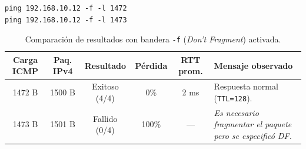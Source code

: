 \documentclass[11pt, a4paper]{article}
\begin{document}
\begin{verbatim}
ping 192.168.10.12 -f -l 1472
ping 192.168.10.12 -f -l 1473
\end{verbatim}

\begin{table}[h!]
\centering
\small
\setlength{\tabcolsep}{4pt}
\caption{Comparación de resultados con bandera \texttt{-f} (\textit{Don't Fragment}) activada.}
\begin{tabularx}{\textwidth}{ccccc>{\raggedright\arraybackslash}X}
\toprule
\textbf{Carga ICMP} & \textbf{Paq. IPv4} & \textbf{Resultado} & \textbf{Pérdida} & \textbf{RTT prom.} & \textbf{Mensaje observado} \\
\midrule
1472 B & 1500 B & Exitoso (4/4) & 0\% & 2 ms & Respuesta normal (\texttt{TTL=128}). \\
1473 B & 1501 B & Fallido (0/4) & 100\% & --- & \textit{Es necesario fragmentar el paquete pero se especificó DF.} \\
\bottomrule
\end{tabularx}
\end{table}
\end{document}
